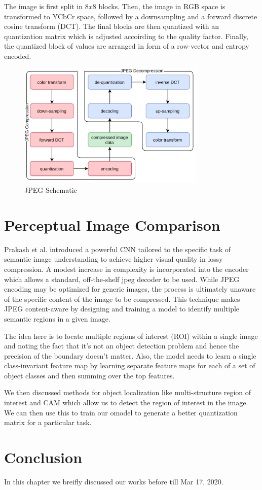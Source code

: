 The image is first split in $8x8$ blocks. 
Then, the image in RGB space is transformed to YCbCr space, followed by a downsampling and a forward discrete cosine transform (DCT). 
The final blocks are then quantized with an quantization matrix which is adjusted accoirding to the quality factor. 
Finally, the quantized block of values are arranged in form of a row-vector and entropy encoded.

\begin{figure}[!ht]
    \centering
    \includegraphics[width=0.80\textwidth]{../fig/chapter5/jpeg-codec.png}
    \caption{JPEG Schematic}
    \label{fig:jpegSchematic}
\end{figure}


\section{Perceptual Image Comparison}

Prakash et al. \cite{Prakash2017} introduced a powerful CNN tailored to the specific task of semantic image understanding to achieve higher visual quality in lossy compression. 
A modest increase in complexity is incorporated into the encoder which allows a standard, off-the-shelf jpeg decoder to be used. 
While JPEG encoding may be optimized for generic images, the process is ultimately unaware of the specific content of the image to be compressed. 
This technique makes JPEG content-aware by designing and training a model to identify multiple semantic regions in a given image.


The idea here is to locate multiple regions of interest (ROI) within a single image and noting the fact that it's not an object detection problem and hence the precision of the boundary doesn't matter. 
Also, the model needs to learn a single class-invariant feature map by learning separate feature maps for each of a set of object classes and then summing over the top features.

We then discussed methods for object localization like multi-structure region of interest and CAM which allow us to detect the region of interest in the image.
We can then use this to train our omodel to generate a better quantization matrix for a particular task.


\section{Conclusion}

In this chapter we breifly discussed our works before till Mar 17, 2020. 